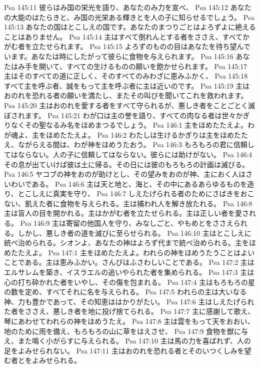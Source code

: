Psa 145:11  彼らはみ国の栄光を語り、あなたのみ力を宣べ、
Psa 145:12  あなたの大能のはたらきと、み国の光栄ある輝きとを人の子に知らせるでしょう。
Psa 145:13  あなたの国はとこしえの国です。あなたのまつりごとはよろずよに絶えることはありません。
Psa 145:14  主はすべて倒れんとする者をささえ、すべてかがむ者を立たせられます。
Psa 145:15  よろずのものの目はあなたを待ち望んでいます。あなたは時にしたがって彼らに食物を与えられます。
Psa 145:16  あなたはみ手を開いて、すべての生けるものの願いを飽かせられます。
Psa 145:17  主はそのすべての道に正しく、そのすべてのみわざに恵みふかく、
Psa 145:18  すべて主を呼ぶ者、誠をもって主を呼ぶ者に主は近いのです。
Psa 145:19  主はおのれを恐れる者の願いを満たし、またその叫びを聞いてこれを救われます。
Psa 145:20  主はおのれを愛する者をすべて守られるが、悪しき者をことごとく滅ぼされます。
Psa 145:21  わが口は主の誉を語り、すべての肉なる者は世々かぎりなくその聖なるみ名をほめまつるでしょう。
Psa 146:1  主をほめたたえよ。わが魂よ、主をほめたたえよ。
Psa 146:2  わたしは生けるかぎりは主をほめたたえ、ながらえる間は、わが神をほめうたおう。
Psa 146:3  もろもろの君に信頼してはならない。人の子に信頼してはならない。彼らには助けがない。
Psa 146:4  その息が出ていけば彼は土に帰る。その日には彼のもろもろの計画は滅びる。
Psa 146:5  ヤコブの神をおのが助けとし、その望みをおのが神、主におく人はさいわいである。
Psa 146:6  主は天と地と、海と、その中にあるあらゆるものを造り、とこしえに真実を守り、
Psa 146:7  しえたげられる者のためにさばきをおこない、飢えた者に食物を与えられる。主は捕われ人を解き放たれる。
Psa 146:8  主は盲人の目を開かれる。主はかがむ者を立たせられる。主は正しい者を愛される。
Psa 146:9  主は寄留の他国人を守り、みなしごと、やもめとをささえられる。しかし、悪しき者の道を滅びに至らせられる。
Psa 146:10  主はとこしえに統べ治められる。シオンよ、あなたの神はよろず代まで統べ治められる。主をほめたたえよ。
Psa 147:1  主をほめたたえよ。われらの神をほめうたうことはよいことである。主は恵みふかい。さんびはふさわしいことである。
Psa 147:2  主はエルサレムを築き、イスラエルの追いやられた者を集められる。
Psa 147:3  主は心の打ち砕かれた者をいやし、その傷を包まれる。
Psa 147:4  主はもろもろの星の数を定め、すべてそれに名を与えられる。
Psa 147:5  われらの主は大いなる神、力も豊かであって、その知恵ははかりがたい。
Psa 147:6  主はしえたげられた者をささえ、悪しき者を地に投げ捨てられる。
Psa 147:7  主に感謝して歌え、琴にあわせてわれらの神をほめうたえ。
Psa 147:8  主は雲をもって天をおおい、地のために雨を備え、もろもろの山に草をはえさせ、
Psa 147:9  食物を獣に与え、また鳴く小がらすに与えられる。
Psa 147:10  主は馬の力を喜ばれず、人の足をよみせられない。
Psa 147:11  主はおのれを恐れる者とそのいつくしみを望む者とをよみせられる。
